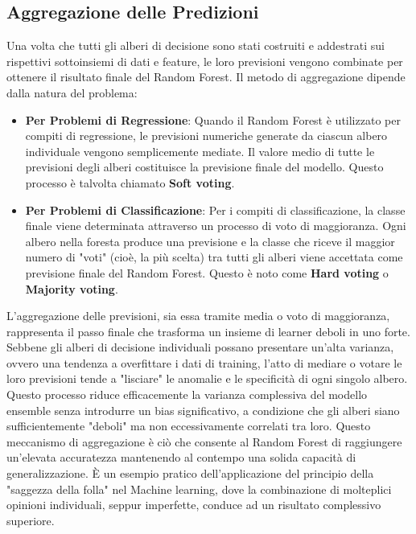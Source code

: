 \documentclass[a4paper,12pt]{report}
\begin{document}
	\subsection{Aggregazione delle Predizioni}
	
	Una volta che tutti gli alberi di decisione sono stati costruiti e addestrati sui rispettivi sottoinsiemi di dati e feature, le loro previsioni vengono combinate per ottenere il risultato finale del Random Forest. Il metodo di aggregazione dipende dalla natura del problema:
	\begin{itemize}
		\item \textbf{Per Problemi di Regressione}: Quando il Random Forest è utilizzato per compiti di regressione, le previsioni numeriche generate da ciascun albero individuale vengono semplicemente mediate. Il valore medio di tutte le previsioni degli alberi costituisce la previsione finale del modello. Questo processo è talvolta chiamato \textbf{Soft voting}.
		\item \textbf{Per Problemi di Classificazione}: Per i compiti di classificazione, la classe finale viene determinata attraverso un processo di voto di maggioranza. Ogni albero nella foresta produce una previsione e la classe che riceve il maggior numero di "voti" (cioè, la più scelta) tra tutti gli alberi viene accettata come previsione finale del Random Forest. Questo è noto come \textbf{Hard voting} o \textbf{Majority voting}.
	\end{itemize}
	
	L'aggregazione delle previsioni, sia essa tramite media o voto di maggioranza, rappresenta il passo finale che trasforma un insieme di learner deboli in uno forte. Sebbene gli alberi di decisione individuali possano presentare un'alta varianza, ovvero una tendenza a overfittare i dati di training, l'atto di mediare o votare le loro previsioni tende a "lisciare" le anomalie e le specificità di ogni singolo albero. Questo processo riduce efficacemente la varianza complessiva del modello ensemble senza introdurre un bias significativo, a condizione che gli alberi siano sufficientemente "deboli" ma non eccessivamente correlati tra loro. Questo meccanismo di aggregazione è ciò che consente al Random Forest di raggiungere un'elevata accuratezza mantenendo al contempo una solida capacità di generalizzazione. È un esempio pratico dell'applicazione del principio della "saggezza della folla" nel Machine learning, dove la combinazione di molteplici opinioni individuali, seppur imperfette, conduce ad un risultato complessivo superiore.
	
\end{document}
